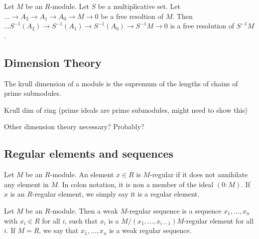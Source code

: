 \begin{lemma}
  \label{lem:loczn_of_resl_is_resl}
  Let $M$ be an $R$-module.
  Let $S$ be a multiplicative set.
  Let $\ldots \to A_2 \to A_1 \to A_0 \to M \to 0$
  be a free resoltion of $M$.
  Then
  $\ldots S^{-1}(A_2) \to S^{-1}(A_1) \to S^{-1}(A_0) \to S^{-1}M \to 0$
  is a free resolution of $S^{-1}M$.
\end{lemma}



\subsection{Dimension Theory}

\begin{definition}
  \label{def:dim_module}
  The krull dimension of a module 
  is the supremum of the lengths
  of chains of prime submodules.
\end{definition}

\begin{definition}
  \label{def:ring}
  Krull dim of ring (prime ideals
  are prime submodules, might need 
  to show this)
\end{definition}

Other dimension theory necessary? Probably?

\subsection{Regular elements and sequences}

\begin{definition}
  \label{def:reg_elt}
  Let $M$ be an $R$-module.
  An element $x \in R$ is $M$-regular if it does 
  not annihilate any element in $M$.
  In colon notation, it is non a member of the ideal
  $( 0 : M )$.
  If $x$ is an $R$-regular element, we simply say it is 
  a regular element.
\end{definition}

\begin{definition}
  \label{def:weak_reg_seq}
  Let $M$ be an $R$-module.
  Then a weak $M$-regular sequence
  is a sequence $x_1, \ldots, x_n$ 
  with $x_i \in R$ for all $i$,
  such that 
  $x_i$ is a
  $M / (x_1, \ldots, x_{i-1}) M$-regular
  element for all $i$.
  If $M = R$, we say that $x_1, \ldots, x_n$
  is a weak regular sequence. 
\end{definition}

